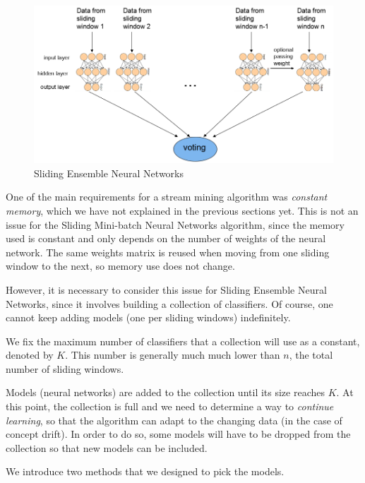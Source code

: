\documentclass[conference]{IEEEtran}
\begin{document}
\begin{figure}[H]
	\centering
	\includegraphics[width=1\linewidth]{figures/SNN}
	\caption{Sliding Ensemble Neural Networks}
	\label{fig:SNN}
\end{figure}

One of the main requirements for a stream mining algorithm was \emph{constant memory}, which we have not explained in the previous sections yet. This is not an issue for the Sliding Mini-batch Neural Networks algorithm, since the memory used is constant and only depends on the number of weights of the neural network. The same weights matrix is reused when moving from one sliding window to the next, so memory use does not change.

However, it is necessary to consider this issue for Sliding Ensemble Neural Networks, since it involves building a collection of classifiers. Of course, one cannot keep adding models (one per sliding windows) indefinitely.

We fix the maximum number of classifiers that a collection will use as a constant, denoted by $K$. This number is generally much much lower than $n$, the total number of sliding windows.

Models (neural networks) are added to the collection until its size reaches $K$. At this point, the collection is full and we need to determine a way to \emph{continue learning}, so that the algorithm can adapt to the changing data (in the case of concept drift). In order to do so, some models will have to be dropped from the collection so that new models can be included.

We introduce two methods that we designed to pick the models.
\end{document}
